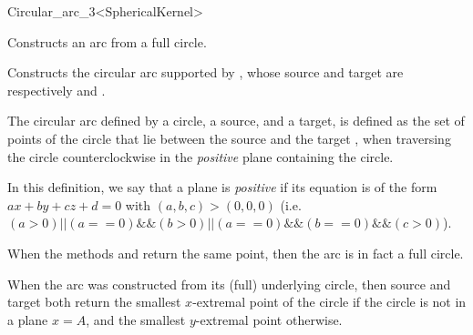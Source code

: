 \begin{ccRefClass}{Circular_arc_3<SphericalKernel>}


\ccIsModel


\ccCreation
{}

\ccThreeToTwo

{Constructs an arc from a full circle.}

{Constructs the circular arc supported by , whose source and target 
are respectively  and .
}

The circular arc defined by a circle, a source, and a target, is
defined as the set of points of the circle that lie between the source
 and the target , when traversing the circle
counterclockwise in the \textit{positive} plane containing the circle.

In this definition, we say that a plane is \textit{positive} if its
equation is of the form $ax+by+cz+d=0$ with $(a,b,c)>(0,0,0)$
(i.e. $(a>0) || (a==0) \&\& (b>0) || (a==0)\&\&(b==0)\&\&(c>0)$).

\ccAccessFunctions

\ccThreeToTwo


\ccGlue
{}

When the methods  and  return the same point, then 
the arc is in fact a full circle. %

When the arc was constructed from its (full) underlying circle, then
source and target both return the smallest $x$-extremal point of the
circle if the circle is not in a plane $x=A$, and the smallest
$y$-extremal point otherwise.


\end{ccRefClass}
